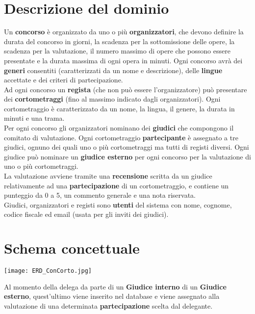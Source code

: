 \newpage
\section{Descrizione del dominio}
Un \textbf{concorso} è organizzato da uno o più \textbf{organizzatori}, che devono definire la durata del concorso in giorni, la scadenza per la sottomissione delle opere, la scadenza per la valutazione, il numero massimo di opere che possono essere presentate e la durata massima di ogni opera in minuti. Ogni concorso avrà dei \textbf{generi} consentiti (caratterizzati da un nome e descrizione), delle \textbf{lingue} accettate e dei criteri di partecipazione.\\

Ad ogni concorso un \textbf{regista} (che non può essere l'organizzatore) può presentare dei \textbf{cortometraggi} (fino al massimo indicato dagli organizzatori). Ogni cortometraggio è caratterizzato da un nome, la lingua, il genere, la durata in minuti e una trama.\\

Per ogni concorso gli organizzatori nominano dei \textbf{giudici} che compongono il comitato di valutazione. Ogni cortometraggio \textbf{partecipante} è assegnato a tre giudici, ognuno dei quali uno o più cortometraggi ma tutti di registi diversi. Ogni giudice può nominare un \textbf{giudice esterno} per ogni concorso per la valutazione di uno o più cortometraggi.\\

La valutazione avviene tramite una \textbf{recensione} scritta da un giudice relativamente ad una \textbf{partecipazione} di un cortometraggio, e contiene un punteggio da 0 a 5, un commento generale e una nota riservata.\\

Giudici, organizzatori e registi sono \textbf{utenti} del sistema con nome, cognome, codice fiscale ed email (usata per gli inviti dei giudici).

\newpage
\section{Schema concettuale}
\begin{center}
	\texttt{[image: ERD\_ConCorto.jpg]}
\end{center}

\begin{note}
	Al momento della delega da parte di un \textbf{Giudice interno} di un \textbf{Giudice esterno}, quest'ultimo viene inserito nel database e viene assegnato alla valutazione di una determinata \textbf{partecipazione} scelta dal delegante.
\end{note}

